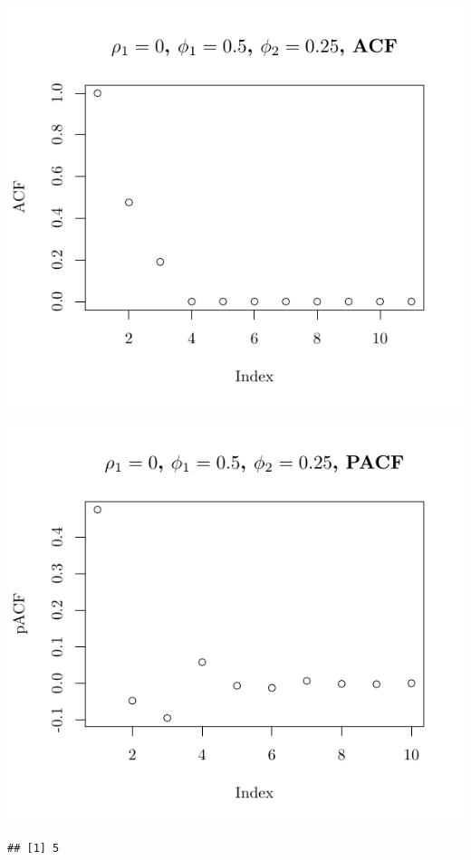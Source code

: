 \documentclass[10pt]{paper}\usepackage[]{graphicx}\usepackage[]{color}
\makeatletter
\def\maxwidth{ %
  \ifdim\Gin@nat@width>\linewidth
    \linewidth
  \else
    \Gin@nat@width
  \fi
}
\newenvironment{kframe}{%
 \def\at@end@of@kframe{}%
 \ifinner\ifhmode%
  \def\at@end@of@kframe{\end{minipage}}%
  \begin{minipage}{\columnwidth}%
 \fi\fi%
 \def\FrameCommand##1{\hskip\@totalleftmargin \hskip-\fboxsep
 \colorbox{shadecolor}{##1}\hskip-\fboxsep
     \hskip-\linewidth \hskip-\@totalleftmargin \hskip\columnwidth}%
 \MakeFramed {\advance\hsize-\width
   \@totalleftmargin\z@ \linewidth\hsize
   \@setminipage}}%
 {\par\unskip\endMakeFramed%
 \at@end@of@kframe}
\newenvironment{knitrout}{}{} %
\makeatother
\begin{document}
\begin{knitrout}
{\centering \includegraphics[width=\maxwidth]{figure/graphics-plotter-11} 

}




{\centering \includegraphics[width=\maxwidth]{figure/graphics-plotter-12} 

}


\begin{kframe}\begin{verbatim}
## [1] 5
\end{verbatim}
\end{kframe}


\end{knitrout}
\end{document}
